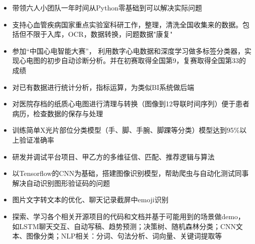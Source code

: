 \documentclass[9pt,a4paper]{altacv}
\begin{document}
\begin{itemize}
	\item 带领六人小团队一年时间从Python零基础到可以解决实际问题
	\item 支持心血管疾病国家重点实验室科研工作，整理，清洗全国收集来的数据。包括但不限于入库，OCR，数据转换，问题数据"康复"
	
	\item 参加“中国心电智能大赛”， 利用数字心电数据和深度学习做多标签分类器，实现心电图的初步自动诊断分析。并在初赛取得全国第9，复赛取得全国第33的成绩
	
	\item 对已有数据进行统计分析，指标运算，为类似BI系统做后端
	
	\item 对医院存档的纸质心电图进行清理与转换（图像到12导联时间序列）便于患者病历，检查数据的保存与处理
\end{itemize}

\divider

\begin{itemize}
	
	\item 训练简单X光片部位分类模型（手、脚、手腕、脚踝等分类）模型达到95\%以上验证准确率
	
\end{itemize}

\divider

%	
%	
%

\begin{itemize}
\item 研发并调试平台项目、甲乙方的多维征信、匹配、推荐逻辑与算法

\item 以Tensorflow的CNN为基础，搭建图像识别模型，帮助爬虫与自动化测试同事解决自动识别图形验证码的问题

\item 图片文字转文本的优化、聊天记录截屏中emoji识别

\item 探索、学习各个相关开源项目的代码和文档并基于可能用到的场景做demo，如LSTM聊天交互、自动写稿、趋势预测；决策树、随机森林分类；CNN文本、图像分类；NLP相关：分词、句法分析、词向量、关键词提取等
\end{itemize}
\end{document}
